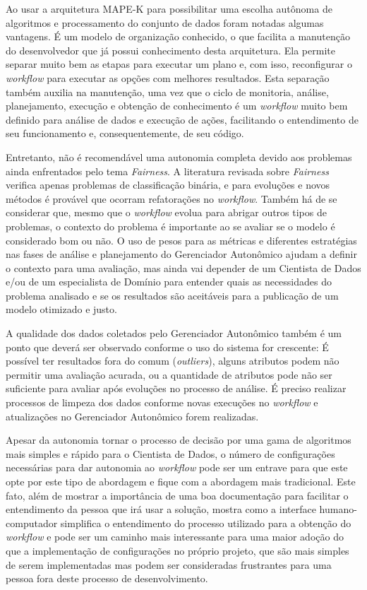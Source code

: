 \documentclass[portugues]{ic-tese}
\begin{document}
Ao usar a arquitetura MAPE-K para possibilitar uma escolha autônoma de algoritmos e processamento do conjunto de dados foram notadas algumas vantagens. É um modelo de organização conhecido, o que facilita a manutenção do desenvolvedor que já possui conhecimento desta arquitetura. Ela permite separar muito bem as etapas para executar um plano e, com isso, reconfigurar o \textit{workflow} para executar as opções com melhores resultados. Esta separação também auxilia na manutenção, uma vez que o ciclo de monitoria, análise, planejamento, execução e obtenção de conhecimento é um \textit{workflow} muito bem definido para análise de dados e execução de ações, facilitando o entendimento de seu funcionamento e, consequentemente, de seu código.

Entretanto, não é recomendável uma autonomia completa devido aos problemas ainda enfrentados pelo tema \textit{Fairness}. A literatura revisada sobre \textit{Fairness} verifica apenas problemas de classificação binária, e para evoluções e novos métodos é provável que ocorram refatorações no \textit{workflow}. Também há de se considerar que, mesmo que o \textit{workflow} evolua para abrigar outros tipos de problemas, o contexto do problema é importante ao se avaliar se o modelo é considerado bom ou não. O uso de pesos para as métricas e diferentes estratégias nas fases de análise e planejamento do Gerenciador Autonômico ajudam a definir o contexto para uma avaliação, mas ainda vai depender de um Cientista de Dados e/ou de um especialista de Domínio para entender quais as necessidades do problema analisado e se os resultados são aceitáveis para a publicação de um modelo otimizado e justo.

A qualidade dos dados coletados pelo Gerenciador Autonômico também é um ponto que deverá ser observado conforme o uso do sistema for crescente: É possível ter resultados fora do comum (\textit{outliers}), alguns atributos podem não permitir uma avaliação acurada, ou a quantidade de atributos pode não ser suficiente para avaliar após evoluções no processo de análise. É preciso realizar processos de limpeza dos dados conforme novas execuções no \textit{workflow} e atualizações no Gerenciador Autonômico forem realizadas.

Apesar da autonomia tornar o processo de decisão por uma gama de algoritmos mais simples e rápido para o Cientista de Dados, o número de configurações necessárias para dar autonomia ao \textit{workflow} pode ser um entrave para que este opte por este tipo de abordagem e fique com a abordagem mais tradicional. Este fato, além de mostrar a importância de uma boa documentação para facilitar o entendimento da pessoa que irá usar a solução, mostra como a interface humano-computador simplifica o entendimento do processo utilizado para a obtenção do \textit{workflow} e pode ser um caminho mais interessante para uma maior adoção do que a implementação de configurações no próprio projeto, que são mais simples de serem implementadas mas podem ser consideradas frustrantes para uma pessoa fora deste processo de desenvolvimento. 
\end{document}
